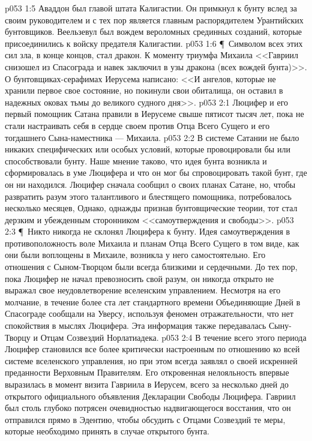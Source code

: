 \vs p053 1:5 Аваддон был главой штата Калигастии. Он примкнул к бунту вслед за своим руководителем и с тех пор является главным распорядителем Урантийских бунтовщиков. Веельзевул был вождем вероломных срединных созданий, которые присоединились к войску предателя Калигастии.
\vs p053 1:6 \P\ Символом всех этих сил зла, в конце концов, стал дракон. К моменту триумфа Михаила <<Гавриил снизошел из Спасограда и навек заключил в узы дракона (всех вождей бунта)>>. О бунтовщиках\hyp{}серафимах Иерусема написано: <<И ангелов, которые не хранили первое свое состояние, но покинули свои обиталища, он оставил в надежных оковах тьмы до великого судного дня>>.
\vs p053 2:1 Люцифер и его первый помощник Сатана правили в Иерусеме свыше пятисот тысяч лет, пока не стали настраивать себя в сердце своем против Отца Всего Сущего и его тогдашнего Сына\hyp{}наместника --- Михаила.
\vs p053 2:2 В системе Сатании не было никаких специфических или особых условий, которые провоцировали бы или способствовали бунту. Наше мнение таково, что идея бунта возникла и сформировалась в уме Люцифера и что он мог бы спровоцировать такой бунт, где он ни находился. Люцифер сначала сообщил о своих планах Сатане, но, чтобы развратить разум этого талантливого и блестящего помощника, потребовалось несколько месяцев, Однако, однажды признав бунтовщические теории, тот стал дерзким и убежденным сторонником <<самоутверждения и свободы>>.
\vs p053 2:3 \P\ Никто никогда не склонял Люцифера к бунту. Идея самоутверждения в противоположность воле Михаила и планам Отца Всего Сущего в том виде, как они были воплощены в Михаиле, возникла у него самостоятельно. Его отношения с Сыном\hyp{}Творцом были всегда близкими и сердечными. До тех пор, пока Люцифер не начал превозносить свой разум, он никогда открыто не выражал свое неудовлетворение вселенским управлением. Несмотря на его молчание, в течение более ста лет стандартного времени Объединяющие Дней в Спасограде сообщали на Уверсу, используя феномен отражательности, что нет спокойствия в мыслях Люцифера. Эта информация также передавалась Сыну\hyp{}Творцу и Отцам Созвездий Норлатиадека.
\vs p053 2:4 В течение всего этого периода Люцифер становился все более критически настроенным по отношению ко всей системе вселенского управления, но при этом всегда заявлял о своей искренней преданности Верховным Правителям. Его откровенная нелояльность впервые выразилась в момент визита Гавриила в Иерусем, всего за несколько дней до открытого официального объявления Декларации Свободы Люцифера. Гавриил был столь глубоко потрясен очевидностью надвигающегося восстания, что он отправился прямо в Эдентию, чтобы обсудить с Отцами Созвездий те меры, которые необходимо принять в случае открытого бунта.
